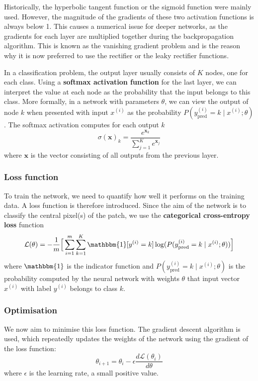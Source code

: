 \documentclass[12pt,a4paper,twoside,openright]{report}
\begin{document}
Historically, the hyperbolic tangent function or the sigmoid function were mainly used. However, the magnitude of the gradients of these two activation functions is always below 1. This causes a numerical issue for deeper networks, as the gradients for each layer are multiplied together during the backpropagation algorithm. This is known as the vanishing gradient problem \cite{vanishing_gradients} and is the reason why it is now preferred to use the rectifier or the leaky rectifier functions.

In a classification problem, the output layer usually consists of $K$ nodes, one for each class. Using a \textbf{softmax activation function} for the last layer, we can interpret the value at each node as the probability that the input belongs to this class.  More formally, in a network with parameters $\theta$, we can view the output of node $k$ when presented with input $x^{(i)}$ as the probability $P(y_{\text{pred}}^{(i)} = k \mid x^{(i)};\theta)$. The softmax activation computes for each output $k$
\begin{equation}
	\sigma(\mathbf{x})_k = \frac{e^{\mathbf{x}_k}}{\sum_{j=1}^{K}e^{\mathbf{x}_j}}
\end{equation}
where $\mathbf{x}$ is the vector consisting of all outputs from the previous layer.

\subsubsection{Loss function}
To train the network, we need to quantify how well it performs on the training data. A loss function is therefore introduced. Since the aim of the network is to classify the central pixel(s) of the patch, we use the \textbf{categorical cross-entropy loss} \cite[p.~137]{bishop} function
\begin{equation}
	\label{eq:loss}
	\mathcal{L}(\theta) = 
	- \frac{1}{m}\Big[\sum_{i=1}^m \sum_{k=1}^K\mathbbm{1}[y^{(i)} = k]\log(P(y_{\text{pred}}^{(i)}=k \mid x^{(i)};\theta))\Big]
\end{equation}
where $\mathbbm{1}$ is the indicator function and $P(y_{\text{pred}}^{(i)}=k \mid x^{(i)};\theta)$ is the probability computed by the neural network with weights $\theta$ that input vector $x^{(i)}$ with label $y^{(i)}$ belongs to class $k$.

\subsubsection{Optimisation}
We now aim to minimise this loss function. The gradient descent algorithm is used, which repeatedly updates the weights of the network using the gradient of the loss function:
\begin{equation}
	\theta_{i+1} = \theta_{i} - \epsilon \frac{d\mathcal{L}(\theta_{i})}{d\theta}
\end{equation}
where $\epsilon$ is the learning rate, a small positive value.
\end{document}
